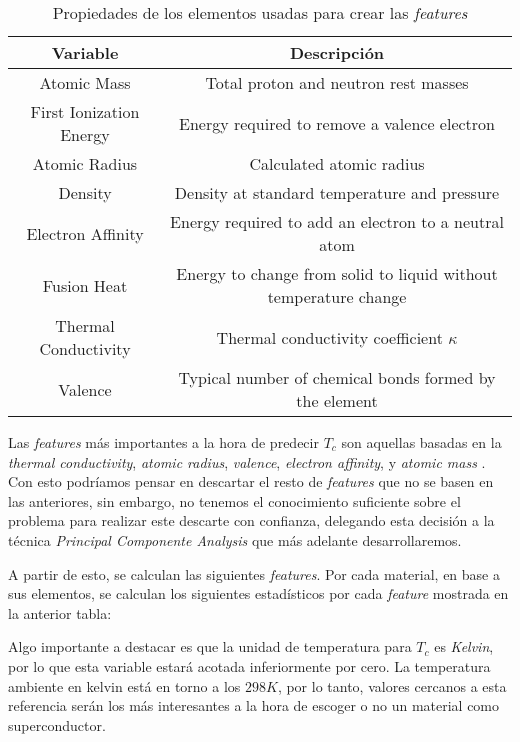 \documentclass[11pt]{article}
\begin{document}
\begin{table}
\begin{center}
\begin{tabular}{|c|c|}
    Variable & Descripción \\
    \hline
    Atomic Mass & Total proton and neutron rest masses \\
    First Ionization Energy & Energy required to remove a valence electron \\
    Atomic Radius & Calculated atomic radius \\
    Density & Density at standard temperature and pressure \\
    Electron Affinity & Energy required to add an electron to a neutral atom \\
    Fusion Heat & Energy to change from solid to liquid without temperature change \\
    Thermal Conductivity &  Thermal conductivity coefficient $\kappa$ \\
    Valence & Typical number of chemical bonds formed by the element \\
    \hline
\end{tabular}
\end{center}
    \caption{Propiedades de los elementos usadas para crear las \emph{features} }
\end{table}

Las \emph{features} más importantes a la hora de predecir $T_c$ son aquellas basadas en la \emph{thermal conductivity}, \emph{atomic radius}, \emph{valence}, \emph{electron affinity}, y \emph{atomic mass} \cite{original_paper_reg:paper}. Con esto podríamos pensar en descartar el resto de \emph{features} que no se basen en las anteriores, sin embargo, no tenemos el conocimiento suficiente sobre el problema para realizar este descarte con confianza, delegando esta decisión a la técnica \emph{Principal Componente Analysis} que más adelante desarrollaremos.

A partir de esto, se calculan las siguientes \emph{features}. Por cada material, en base a sus elementos, se calculan los siguientes estadísticos por cada \emph{feature} mostrada en la anterior tabla:

Algo importante a destacar es que la unidad de temperatura para $T_c$ es \emph{Kelvin}, por lo que esta variable estará acotada inferiormente por cero. La temperatura ambiente en kelvin está en torno a los $298K$, por lo tanto, valores cercanos a esta referencia serán los más interesantes a la hora de escoger o no un material como superconductor.
\end{document}

